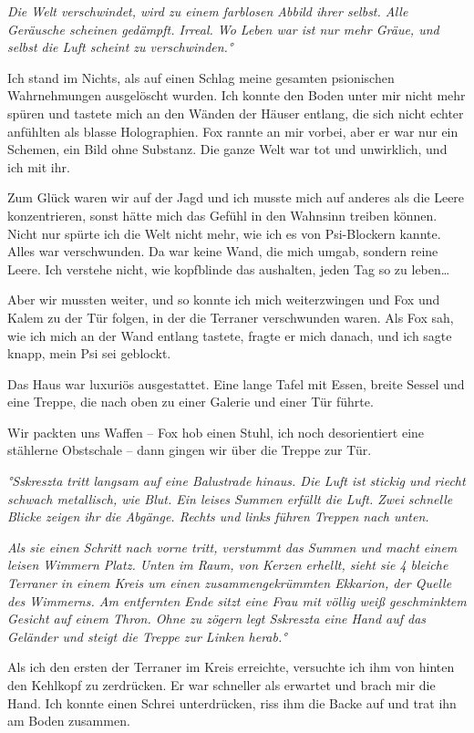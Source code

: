 \documentclass[11pt]{article}
\begin{document}
\emph{Die Welt verschwindet, wird zu einem farblosen Abbild ihrer
selbst. Alle Geräusche scheinen gedämpft. Irreal. Wo Leben war ist nur
mehr Gräue, und selbst die Luft scheint zu verschwinden.°}

Ich stand im Nichts, als auf einen Schlag meine gesamten psionischen
Wahrnehmungen ausgelöscht wurden. Ich konnte den Boden unter mir nicht
mehr spüren und tastete mich an den Wänden der Häuser entlang, die sich
nicht echter anfühlten als blasse Holographien. Fox rannte an mir
vorbei, aber er war nur ein Schemen, ein Bild ohne Substanz. Die ganze
Welt war tot und unwirklich, und ich mit ihr.

Zum Glück waren wir auf der Jagd und ich musste mich auf anderes als die
Leere konzentrieren, sonst hätte mich das Gefühl in den Wahnsinn treiben
können. Nicht nur spürte ich die Welt nicht mehr, wie ich es von
Psi-Blockern kannte. Alles war verschwunden. Da war keine Wand, die mich
umgab, sondern reine Leere. Ich verstehe nicht, wie kopfblinde das
aushalten, jeden Tag so zu leben\ldots{}

Aber wir mussten weiter, und so konnte ich mich weiterzwingen und Fox
und Kalem zu der Tür folgen, in der die Terraner verschwunden waren. Als
Fox sah, wie ich mich an der Wand entlang tastete, fragte er mich
danach, und ich sagte knapp, mein Psi sei geblockt.

Das Haus war luxuriös ausgestattet. Eine lange Tafel mit Essen, breite
Sessel und eine Treppe, die nach oben zu einer Galerie und einer Tür
führte.

Wir packten uns Waffen -- Fox hob einen Stuhl, ich noch desorientiert
eine stählerne Obstschale -- dann gingen wir über die Treppe zur Tür.

\emph{°Sskreszta tritt langsam auf eine Balustrade hinaus. Die Luft ist
stickig und riecht schwach metallisch, wie Blut. Ein leises Summen
erfüllt die Luft. Zwei schnelle Blicke zeigen ihr die Abgänge. Rechts
und links führen Treppen nach unten.}

\emph{Als sie einen Schritt nach vorne tritt, verstummt das Summen und
macht einem leisen Wimmern Platz. Unten im Raum, von Kerzen erhellt,
sieht sie 4 bleiche Terraner in einem Kreis um einen zusammengekrümmten
Ekkarion, der Quelle des Wimmerns. Am entfernten Ende sitzt eine Frau
mit völlig weiß geschminktem Gesicht auf einem Thron. Ohne zu zögern
legt Sskreszta eine Hand auf das Geländer und steigt die Treppe zur
Linken herab.°}

Als ich den ersten der Terraner im Kreis erreichte, versuchte ich ihm
von hinten den Kehlkopf zu zerdrücken. Er war schneller als erwartet und
brach mir die Hand. Ich konnte einen Schrei unterdrücken, riss ihm die
Backe auf und trat ihn am Boden zusammen.
\end{document}
